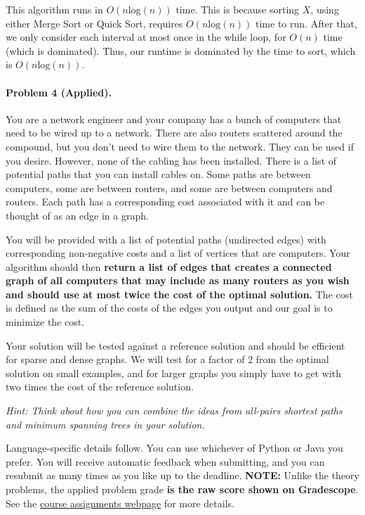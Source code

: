 \documentclass[11pt]{article}
\begin{document}
This algorithm runs in $O(n\text{log}(n))$ time. This is because sorting $X$, using either Merge Sort or Quick Sort, requires $O(n\text{log}(n))$ time to run. After that, we only consider each interval at most once in the while loop, for $O(n)$ time (which is dominated). Thus, our runtime is dominated by the time to sort, which is $O(n\text{log}(n))$.


\newpage
\paragraph{Problem 4 (Applied).} You are a network engineer and your company has a bunch of computers that need to be wired up to a network. There are also routers scattered around the compound, but you don't need to wire them to the network. They can be used if you desire. However, none of the cabling has been installed. There is a list of potential paths that you can install cables on. Some paths are between computers, some are between routers, and some are between computers and routers. Each path has a corresponding cost associated with it and can be thought of as an edge in a graph. 

You will be provided with a list of potential paths (undirected edges) with corresponding non-negative costs and a list of vertices that are computers. Your algorithm should then \textbf{return a list of edges that creates a connected graph of all computers that may include as many routers as you wish and should use at most twice the cost of the optimal solution.} The cost is defined as the sum of the costs of the edges you output and our goal is to minimize the cost. 

Your solution will be tested against a reference solution and should be efficient for sparse and dense graphs. We will test for a factor of 2 from the optimal solution on small examples, and for larger graphs you simply have to get with two times the cost of the reference solution.

\textit{Hint: Think about how you can combine the ideas from all-pairs shortest paths and minimum spanning trees in your solution.}

Language-specific details follow. You can use whichever of Python or Java you prefer. You will receive automatic feedback when submitting, and you can resubmit as many times as you like up to the deadline. \textbf{NOTE:} Unlike the theory problems, the applied problem grade \textbf{is the raw score shown on Gradescope}. See the \href{https://sites.duke.edu/spring24compsci330/assignments/}{course assignments webpage} for more details. 
\end{document}
